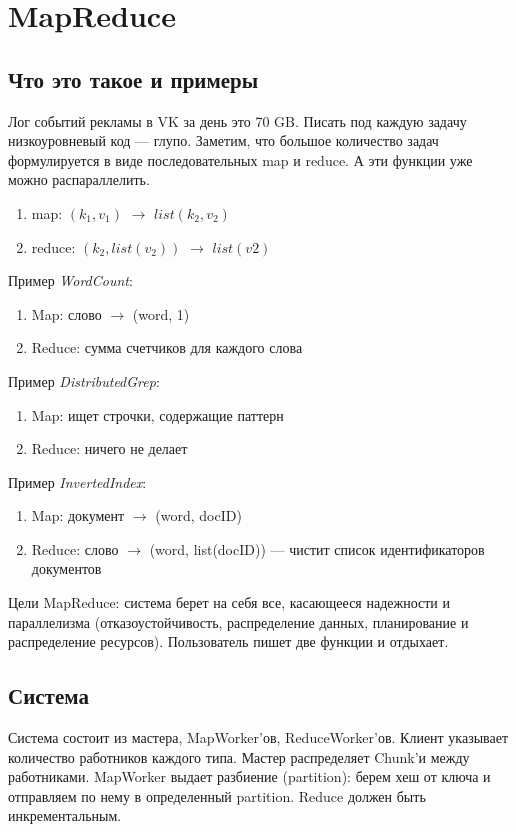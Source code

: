 \section{MapReduce}
\subsection{Что это такое и примеры}
    \quad Лог событий рекламы в VK за день это 70 GB. Писать под каждую задачу низкоуровневый код --- глупо. Заметим, что большое количество задач формулируется в виде последовательных map и reduce. А эти функции уже можно распараллелить.
    \begin{enumerate}
        \item map: $(k_1, v_1)$ $\rightarrow$ $list(k_2, v_2)$
        \item reduce: $(k_2, list(v_2))$ $\rightarrow$ $list(v2)$
    \end{enumerate}
    
    Пример \textit{WordCount}:
    \begin{enumerate}
        \item Map: слово $\rightarrow$ (word, 1)
        \item Reduce: сумма счетчиков для каждого слова
    \end{enumerate}
    
    Пример \textit{DistributedGrep}:
    \begin{enumerate}
        \item Map: ищет строчки, содержащие паттерн
        \item Reduce: ничего не делает
    \end{enumerate}
    Пример \textit{InvertedIndex}:
    \begin{enumerate}
        \item Map: документ $\rightarrow$ (word, docID)
        \item Reduce: слово $\rightarrow$ (word, list(docID)) --- чистит список идентификаторов документов
    \end{enumerate}
    
    \quad Цели MapReduce: система берет на себя все, касающееся надежности и параллелизма (отказоустойчивость, распределение данных, планирование и распределение ресурсов). Пользователь пишет две функции и отдыхает.
    
\subsection{Система}
    \quad Система состоит из мастера, MapWorker'ов, ReduceWorker'ов. Клиент указывает количество работников каждого типа. Мастер распределяет Chunk'и между работниками. MapWorker выдает разбиение (partition): берем хеш от ключа и отправляем по нему в определенный partition. Reduce должен быть инкрементальным.
    
